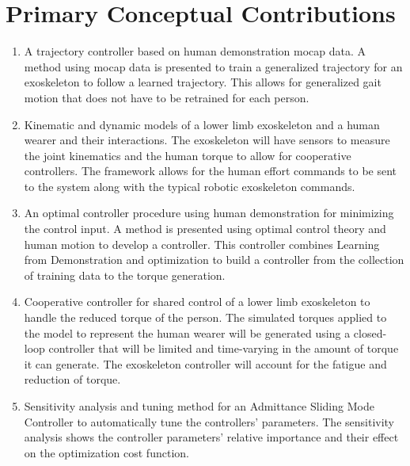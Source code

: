 \section{Primary Conceptual Contributions}
\begin{enumerate}[wide, nosep, labelindent = 0pt, topsep = 1ex]
     \item A trajectory controller based on human demonstration mocap data. A method using mocap data is presented to train a generalized trajectory for an exoskeleton to follow a learned trajectory. This allows for generalized gait motion that does not have to be retrained for each person. 
    \item Kinematic and dynamic models of a lower limb exoskeleton and a human wearer and their interactions. The exoskeleton will have sensors to measure the joint kinematics and the human torque to allow for cooperative controllers. The framework allows for the human effort commands to be sent to the system along with the typical robotic exoskeleton commands. 
    \item An optimal controller procedure using human demonstration for minimizing the control input. A method is presented using optimal control theory and human motion to develop a controller. This controller combines Learning from Demonstration and optimization to build a controller from the collection of training data to the torque generation. 
    \item Cooperative controller for shared control of a lower limb exoskeleton to handle the reduced torque of the person. The simulated torques applied to the model to represent the human wearer will be generated using a closed-loop controller that will be limited and time-varying in the amount of torque it can generate. The exoskeleton controller will account for the fatigue and reduction of torque. 
    \item Sensitivity analysis and tuning method for an Admittance Sliding Mode Controller to automatically tune the controllers' parameters. The sensitivity analysis shows the controller parameters' relative importance and their effect on the optimization cost function.  
\end{enumerate}

